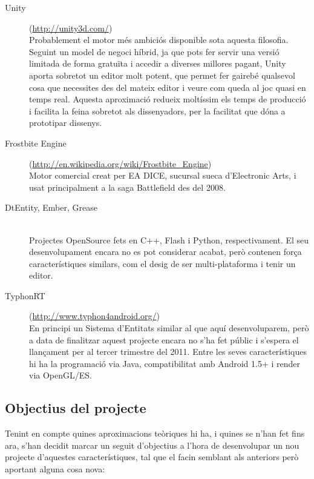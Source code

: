\begin{description}
  \item[Unity] (\url{http://unity3d.com/}) \hfill \\
    Probablement el motor més ambiciós disponible sota aquesta filosofia. Seguint un model de negoci híbrid, ja que pots fer servir una versió limitada de forma gratuïta i accedir a diverses millores pagant, Unity aporta sobretot un editor molt potent, que permet fer gairebé qualsevol cosa que necessites des del mateix editor i veure com queda al joc quasi en temps real. Aquesta aproximació redueix moltíssim els temps de producció i facilita la feina sobretot als dissenyadors, per la facilitat que dóna a prototipar dissenys.
    
  \item[Frostbite Engine] (\url{http://en.wikipedia.org/wiki/Frostbite_Engine}) \hfill \\
    Motor comercial creat per EA DICE, sucursal sueca d'Electronic Arts, i usat principalment a la saga Battlefield des del 2008.
    
  \item[DtEntity, Ember, Grease] \citep{EntityWiki} \hfill \\
    Projectes OpenSource fets en C++, Flash i Python, respectivament. El seu desenvolupament encara no es pot considerar acabat, però contenen força característiques similars, com el desig de ser multi-plataforma i tenir un editor.
    
  \item[TyphonRT] (\url{http://www.typhon4android.org/}) \hfill \\
    En principi un Sistema d'Entitats similar al que aquí desenvoluparem, però a data de finalitzar aquest projecte encara no s'ha fet públic i s'espera el llançament per al tercer trimestre del 2011. Entre les seves característiques hi ha la programació via Java, compatibilitat amb Android 1.5+ i render via OpenGL/ES.
  
\end{description}

\subsection{Objectius del projecte}

Tenint en compte quines aproximacions teòriques hi ha, i quines se n'han fet fins ara, s'han decidit marcar un seguit d'objectius a l'hora de desenvolupar un nou projecte d'aquestes característiques, tal que el facin semblant als anteriors però aportant alguna cosa nova:

